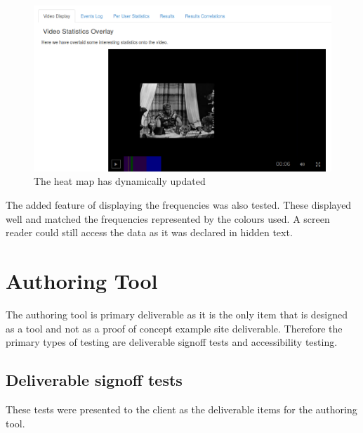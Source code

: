\begin{figure}[h]
	\centering 
		\includegraphics[scale=0.4]{../figures/heatmapDisplay.png} 		
	\caption{\label{Figure: Heat map display} The heat map has dynamically updated} 	
\end{figure}

The added feature of displaying the frequencies was also tested. These displayed well and matched the frequencies represented by the colours used. A screen reader could still access the data as it was declared in hidden text.

\section{Authoring Tool}

The authoring tool is primary deliverable as it is the only item that is designed as a tool and not as a proof of concept example site deliverable. Therefore the primary types of testing are deliverable signoff tests and accessibility testing.

\subsection{Deliverable signoff tests}

These tests were presented to the client as the deliverable items for the authoring tool.

